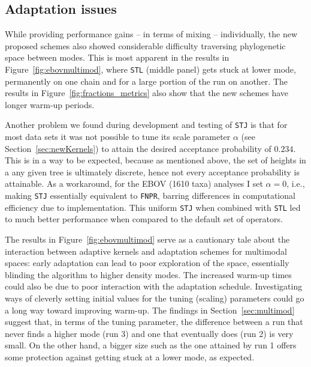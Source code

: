 \subsection{Adaptation issues}
\label{sec:STJadap}

While providing performance gains -- in terms of mixing -- individually, the new proposed schemes also showed considerable difficulty traversing phylogenetic space between modes.
This is most apparent in the results in Figure~\ref{fig:ebovmultimod}, where \verb|STL| (middle panel) gets stuck at lower mode, permanently on one chain and for a large portion of the run on another.
The results in Figure~\ref{fig:fractions_metrics} also show that the new schemes have longer warm-up periods.

Another problem we found during development and testing of \verb|STJ| is that for most data sets it was not possible to tune its scale parameter $\alpha$ (see Section~\ref{sec:newKernels}) to attain the desired acceptance probability of $0.234$.
This is in a way to be expected, because as mentioned above, the set of heights in a any given tree is ultimately discrete, hence not every acceptance probability is attainable.
As a workaround, for the EBOV (1610 taxa) analyses I set $\alpha = 0$, i.e., making \verb|STJ| essentially equivalent to \verb|FNPR|, barring differences in computational efficiency due to implementation.
This uniform \verb|STJ| when combined with \verb|STL| led to much better performance when compared to the default set of operators.

The results in Figure~\ref{fig:ebovmultimod} serve as a cautionary tale about the interaction between adaptive kernels and adaptation schemes for multimodal spaces: early adaptation can lead to poor exploration of the space, essentially blinding the algorithm to higher density modes.
The increased warm-up times could also be due to poor interaction with the adaptation schedule.
Investigating ways of cleverly setting initial values for the tuning (scaling) parameters could go a long way toward improving warm-up.
The findings in Section~\ref{sec:multimod} suggest that, in terms of the tuning parameter, the difference between a run that never finds a higher mode (run 3) and one that eventually does (run 2) is very small.
On the other hand, a bigger size such as the one attained by run 1 offers some protection against getting stuck at a lower mode, as expected.

